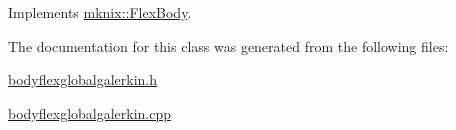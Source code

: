 Implements \hyperlink{classmknix_1_1_flex_body_a0058d01bf9b5b90b22a9f4d6ca0745de}{mknix\-::\-Flex\-Body}.



The documentation for this class was generated from the following files\-:\begin{DoxyCompactItemize}
\item 
\hyperlink{bodyflexglobalgalerkin_8h}{bodyflexglobalgalerkin.\-h}\item 
\hyperlink{bodyflexglobalgalerkin_8cpp}{bodyflexglobalgalerkin.\-cpp}\end{DoxyCompactItemize}
